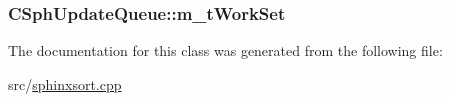 \hypertarget{classCSphUpdateQueue_ad48213763b192a49424007a383c7526e}{
\subsubsection[{m\-\_\-t\-Work\-Set}]{ C\-Sph\-Update\-Queue\-::m\-\_\-t\-Work\-Set\hspace{0.3cm}{\ttfamily [private]}}}\label{classCSphUpdateQueue_ad48213763b192a49424007a383c7526e}


The documentation for this class was generated from the following file\-:\begin{DoxyCompactItemize}
\item 
src/\hyperlink{sphinxsort_8cpp}{sphinxsort.\-cpp}\end{DoxyCompactItemize}
